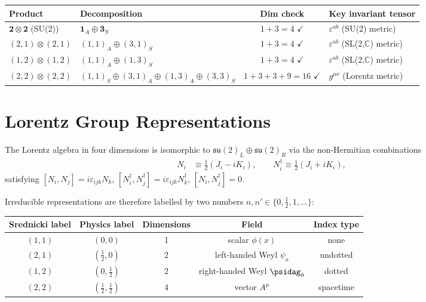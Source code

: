 \begin{center}
\renewcommand{\arraystretch}{1.5}
\begin{tabular}{@{}llcl@{}}
  \toprule
  Product & Decomposition & Dim check & Key invariant tensor \\
  \midrule
  $\mathbf{2}\otimes\mathbf{2}$ (SU(2))
    & $\mathbf{1}_A \oplus \mathbf{3}_S$
    & $1+3=4$ $\checkmark$
    & $\varepsilon^{ab}$ (SU(2) metric) \\
  $(2,1)\otimes(2,1)$
    & $(1,1)_A \oplus (3,1)_S$
    & $1+3=4$ $\checkmark$
    & $\varepsilon^{ab}$ (SL(2,$\mathbb{C}$) metric) \\
  $(1,2)\otimes(1,2)$
    & $(1,1)_A \oplus (1,3)_S$
    & $1+3=4$ $\checkmark$
    & $\varepsilon^{\dot{a}\dot{b}}$ (SL(2,$\mathbb{C}$) metric) \\
  $(2,2)\otimes(2,2)$
    & $(1,1)_S \oplus (3,1)_A \oplus (1,3)_A \oplus (3,3)_S$
    & $1+3+3+9=16$ $\checkmark$
    & $g^{\mu\nu}$ (Lorentz metric) \\
  \bottomrule
\end{tabular}
\end{center}

\section{Lorentz Group Representations}

The Lorentz algebra in four dimensions is isomorphic to
$\mathfrak{su}(2)_L \oplus \mathfrak{su}(2)_R$ via the
non-Hermitian combinations
\begin{align}
  N_i &\equiv \tfrac{1}{2}(J_i - iK_i), \qquad
  N_i^\dagger \equiv \tfrac{1}{2}(J_i + iK_i),
\end{align}
satisfying $[N_i, N_j] = i\varepsilon_{ijk}N_k$,
$[N_i^\dagger, N_j^\dagger] = i\varepsilon_{ijk}N_k^\dagger$,
$[N_i, N_j^\dagger] = 0$.

Irreducible representations are therefore labelled by two numbers
$n, n' \in \{0, \tfrac{1}{2}, 1, \ldots\}$:

\medskip
\begin{center}
\begin{tabular}{@{}ccccc@{}}
  \toprule
  Srednicki label & Physics label & Dimensions & Field & Index type \\
  \midrule
  $(1,1)$ & $(0,0)$ & 1 & scalar $\phi(x)$ & none \\
  $(2,1)$ & $(\tfrac{1}{2},0)$ & 2 & left-handed Weyl $\psi_a$ & undotted \\
  $(1,2)$ & $(0,\tfrac{1}{2})$ & 2 & right-handed Weyl $\psidag_{\dot{a}}$ & dotted \\
  $(2,2)$ & $(\tfrac{1}{2},\tfrac{1}{2})$ & 4 & vector $A^\mu$ & spacetime \\
  \bottomrule
\end{tabular}
\end{center}
\medskip


